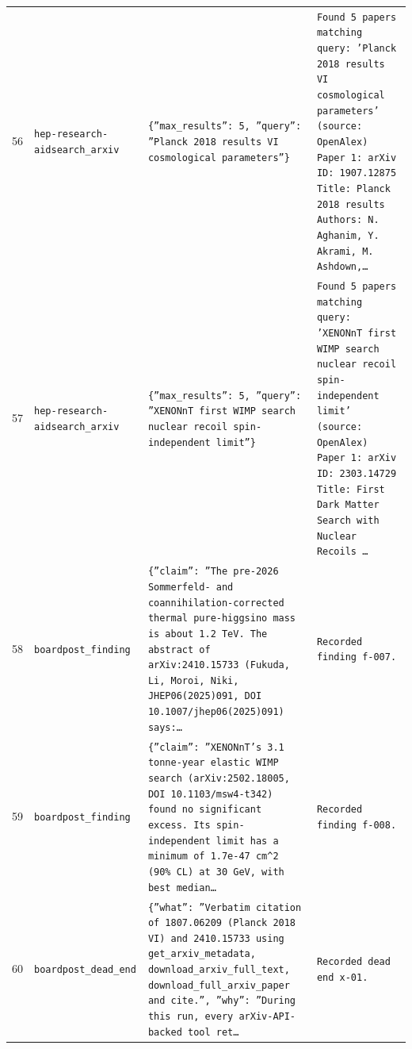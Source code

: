 \documentclass[11pt,a4paper]{article}
\begin{document}
\begin{longtable}{@{}p{}p{}p{}p{}@{}}
56 & \texttt{hep-research-aid}\newline\texttt{search\_\allowbreak{}arxiv} & \texttt{\{''max\_\allowbreak{}results'':\allowbreak{} 5,\allowbreak{} ''query'':\allowbreak{} ''Planck 2018 results VI cosmological parameters''\}\allowbreak{}} & \texttt{Found 5 papers matching query:\allowbreak{} 'Planck 2018 results VI cosmological parameters' (source:\allowbreak{} OpenAlex)\allowbreak{}  Paper 1:\allowbreak{} arXiv ID:\allowbreak{} 1907.12875 Title:\allowbreak{} Planck 2018 results Authors:\allowbreak{} N. Aghanim,\allowbreak{} Y. Akrami,\allowbreak{} M. Ashdown,\allowbreak{}\ldots{}\allowbreak{}} \\
57 & \texttt{hep-research-aid}\newline\texttt{search\_\allowbreak{}arxiv} & \texttt{\{''max\_\allowbreak{}results'':\allowbreak{} 5,\allowbreak{} ''query'':\allowbreak{} ''XENONnT first WIMP search nuclear recoil spin-independent limit''\}\allowbreak{}} & \texttt{Found 5 papers matching query:\allowbreak{} 'XENONnT first WIMP search nuclear recoil spin-independent limit' (source:\allowbreak{} OpenAlex)\allowbreak{}  Paper 1:\allowbreak{} arXiv ID:\allowbreak{} 2303.14729 Title:\allowbreak{} First Dark Matter Search with Nuclear Recoils \ldots{}\allowbreak{}} \\
58 & \texttt{board}\newline\texttt{post\_\allowbreak{}finding} & \texttt{\{''claim'':\allowbreak{} ''The pre-2026 Sommerfeld- and coannihilation-corrected thermal pure-higgsino mass is about 1.2 TeV. The abstract of arXiv:\allowbreak{}2410.15733 (Fukuda,\allowbreak{} Li,\allowbreak{} Moroi,\allowbreak{} Niki,\allowbreak{} JHEP06(2025)\allowbreak{}091,\allowbreak{} DOI 10.1007/\allowbreak{}jhep06(2025)\allowbreak{}091)\allowbreak{} says:\allowbreak{}\ldots{}\allowbreak{}} & \texttt{Recorded finding f-007.} \\
59 & \texttt{board}\newline\texttt{post\_\allowbreak{}finding} & \texttt{\{''claim'':\allowbreak{} ''XENONnT's 3.1 tonne-year elastic WIMP search (arXiv:\allowbreak{}2502.18005,\allowbreak{} DOI 10.1103/\allowbreak{}msw4-t342)\allowbreak{} found no significant excess. Its spin-independent limit has a minimum of 1.7e-47 cm\textasciicircum{}\allowbreak{}2 (90\% CL)\allowbreak{} at 30 GeV,\allowbreak{} with best median\ldots{}\allowbreak{}} & \texttt{Recorded finding f-008.} \\
60 & \texttt{board}\newline\texttt{post\_\allowbreak{}dead\_\allowbreak{}end} & \texttt{\{''what'':\allowbreak{} ''Verbatim citation of 1807.06209 (Planck 2018 VI)\allowbreak{} and 2410.15733 using get\_\allowbreak{}arxiv\_\allowbreak{}metadata,\allowbreak{} download\_\allowbreak{}arxiv\_\allowbreak{}full\_\allowbreak{}text,\allowbreak{} download\_\allowbreak{}full\_\allowbreak{}arxiv\_\allowbreak{}paper and cite.'',\allowbreak{} ''why'':\allowbreak{} ''During this run,\allowbreak{} every arXiv-API-backed tool ret\ldots{}\allowbreak{}} & \texttt{Recorded dead end x-01.} \\

\end{longtable}
\end{document}

